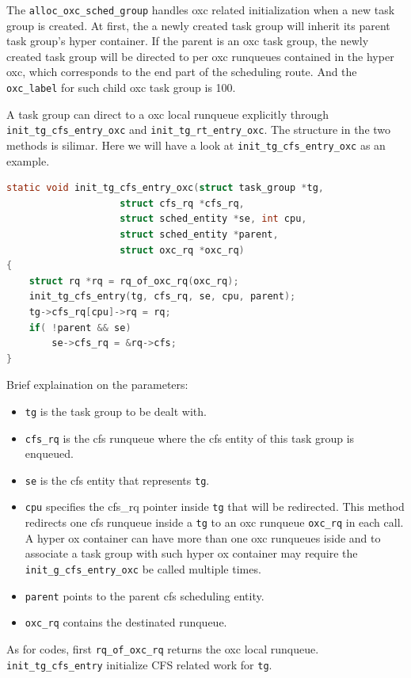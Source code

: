 The \texttt{alloc\_oxc\_sched\_group} handles oxc related initialization when a 
new task group is created. At first, the a newly created task group will inherit
its parent task group's hyper container. If the parent is an oxc task group, the
newly created task group will be directed to per oxc runqueues contained in the
hyper oxc, which corresponds to the end part of the scheduling route.  And 
the \texttt{oxc\_label} for such child oxc task group is 100.

A task group can direct to a oxc local runqueue explicitly through 
\texttt{init\_tg\_cfs\_entry\_oxc} and \texttt{init\_tg\_rt\_entry\_oxc}.
The structure in the two methods is silimar. Here we will have a look at 
\texttt{init\_tg\_cfs\_entry\_oxc} as an example.
\begin{lstlisting}[language=C, caption={To explicitlt direct a task group 
						to an OXC local runqueue}]
static void init_tg_cfs_entry_oxc(struct task_group *tg,
					struct cfs_rq *cfs_rq,
					struct sched_entity *se, int cpu,
					struct sched_entity *parent,
					struct oxc_rq *oxc_rq)
{
	struct rq *rq = rq_of_oxc_rq(oxc_rq);
	init_tg_cfs_entry(tg, cfs_rq, se, cpu, parent);
	tg->cfs_rq[cpu]->rq = rq;
	if( !parent && se)
		se->cfs_rq = &rq->cfs;
} 
\end{lstlisting}
Brief explaination on the parameters:
\begin{itemize}
\item \texttt{tg} is the task group to be dealt with.
\item \texttt{cfs\_rq} is the cfs runqueue where the cfs entity of this 
		task group is enqueued. 
\item \texttt{se} is the cfs entity that represents \texttt{tg}.
\item \texttt{cpu} specifies the cfs\_rq pointer inside \texttt{tg} that
		will be redirected.
		This method redirects one cfs runqueue inside a \texttt{tg} 
		to an oxc runqueue \texttt{oxc\_rq} in each call. A hyper ox 
		container can have more than one oxc runqueues iside
		and to associate a task group with such hyper ox container 
		may require the \texttt{init\_g\_cfs\_entry\_oxc} be called 
		multiple times.
\item \texttt{parent} points to the parent cfs scheduling entity.
\item \texttt{oxc\_rq} contains the destinated runqueue. 
\end{itemize}
As for codes, first \texttt{rq\_of\_oxc\_rq} returns the oxc local runqueue.
\texttt{init\_tg\_cfs\_entry} initialize CFS related work for \texttt{tg}.
